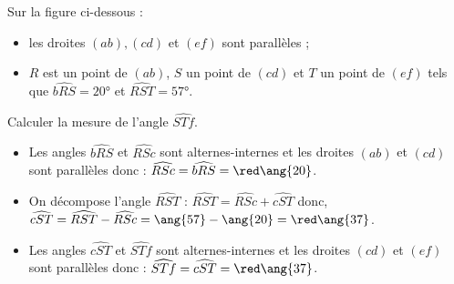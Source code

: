 \begin{exercice*}
    Sur la figure ci-dessous :
    \begin{itemize}
       \item les droites $(ab), (cd)$ et $(ef)$ sont parallèles ;
       \item $R$ est un point de $(ab)$, $S$ un point de $(cd)$ et $T$ un point de $(ef)$ tels que $\widehat{bRS} =\ang{20}$ et $\widehat{RST} =\ang{57}$.
    \end{itemize}
    Calculer la mesure de l'angle $\widehat{STf}$. \\
    \begin{center}    
   \end{center}
\end{exercice*}
 
\begin{corrige}
   \begin{itemize}
      \item Les angles $\widehat{bRS}$ et $\widehat{RSc}$ sont alternes-internes et les droites $(ab)$ et $(cd)$ sont parallèles donc : $\widehat{RSc} =\widehat{bRS} =\red \ang{20}$.
      \item On décompose l'angle $\widehat{RST}$ : $\widehat{RST} =\widehat{RSc}+\widehat{cST}$ donc, $\widehat{cST} =\widehat{RST} -\widehat{RSc} =\ang{57}-\ang{20} =\red \ang{37}$.
      \item Les angles $\widehat{cST}$ et $\widehat{STf}$ sont alternes-internes et les droites $(cd)$ et $(ef)$ sont parallèles donc : $\widehat{STf} =\widehat{cST} =\red \ang{37}$.
   \end{itemize}
\end{corrige}